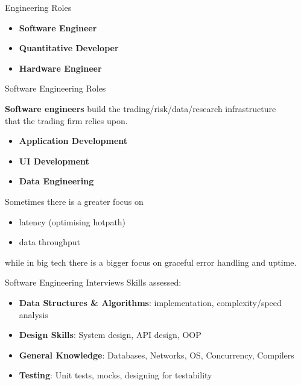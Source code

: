 \begin{frame}{Engineering Roles}

  \begin{itemize}
    \item \textbf{Software Engineer}
    \item \textbf{Quantitative Developer}
    \item \textbf{Hardware Engineer}
  \end{itemize}
\end{frame}

\begin{frame}{Software Engineering Roles}
  \begin{sqt:definition}
    \textbf{Software engineers} build the trading/risk/data/research infrastructure \\
    that the trading firm relies upon.
  \end{sqt:definition}

  \begin{itemize}
    \item \textbf{Application Development}
    \item \textbf{UI Development}
    \item \textbf{Data Engineering}
  \end{itemize}

  Sometimes there is a greater focus on
  \begin{itemize}
    \item latency (optimising hotpath)
    \item data throughput
  \end{itemize}
  while in big tech there is a bigger focus on graceful error handling and uptime.
\end{frame}

\begin{frame}{Software Engineering Interviews}
  Skills assessed:
  \begin{itemize}
    \item \textbf{Data Structures \& Algorithms}: implementation, complexity/speed analysis
    \item \textbf{Design Skills}: System design, API design, OOP
    \item \textbf{General Knowledge}: Databases, Networks, OS, Concurrency, Compilers
    \item \textbf{Testing}: Unit tests, mocks, designing for testability
  \end{itemize}
\end{frame}

